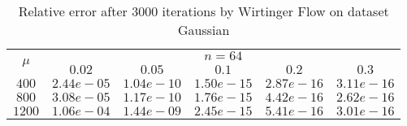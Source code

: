 \begin{table}\label{gaussian}
\centering
\begin{tabular}{|c|c|c|c|c|c|}

\hline
\multirow{2}{*}{ $\mu$} &\multicolumn{5}{c|}{$n = 64 $}\\\cline{2-6}
 &$0.02$ &$0.05$ &$0.1$ &$0.2$ &$0.3$\\\hline
$400$ & $2.44e-05$ & $1.04e-10$ & $1.50e-15$ & $2.87e-16$ & $3.11e-16$\\\hline
$800$ & $3.08e-05$ & $1.17e-10$ & $1.76e-15$ & $4.42e-16$ & $2.62e-16$\\\hline
$1200$ & $1.06e-04$ & $1.44e-09$ & $2.45e-15$ & $5.41e-16$ & $3.01e-16$\\\hline
\end{tabular}
\caption{Relative error after $3000$ iterations by Wirtinger Flow on dataset Gaussian}
\end{table}
